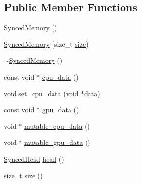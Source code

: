 \subsection*{Public Member Functions}
\begin{DoxyCompactItemize}
\item 
\hyperlink{classcaffe_1_1_synced_memory_a1554c965fa580eee8d425c9cc14ac264}{Synced\+Memory} ()
\item 
\hyperlink{classcaffe_1_1_synced_memory_a858ddd33252ddfd6e8bb2dc59ab7691b}{Synced\+Memory} (size\+\_\+t \hyperlink{classcaffe_1_1_synced_memory_ae181c18b137d62de33bc91501aabb841}{size})
\item 
\hyperlink{classcaffe_1_1_synced_memory_a0f9e02554b59ba5357ac1d0c9256560a}{$\sim$\+Synced\+Memory} ()
\item 
const void $\ast$ \hyperlink{classcaffe_1_1_synced_memory_a5ffa0255e243f223e1af064fb7322ae4}{cpu\+\_\+data} ()
\item 
void \hyperlink{classcaffe_1_1_synced_memory_a4118cdf888d8663c4f88c037ce3e3b8e}{set\+\_\+cpu\+\_\+data} (void $\ast$data)
\item 
const void $\ast$ \hyperlink{classcaffe_1_1_synced_memory_acf04d9fabcde73902bdad08672696933}{gpu\+\_\+data} ()
\item 
void $\ast$ \hyperlink{classcaffe_1_1_synced_memory_ab32cd46d7f0cf524d79e4ba7da7449dd}{mutable\+\_\+cpu\+\_\+data} ()
\item 
void $\ast$ \hyperlink{classcaffe_1_1_synced_memory_ab6ca4faa7233c8ac2319acb72ba0441e}{mutable\+\_\+gpu\+\_\+data} ()
\item 
\hyperlink{classcaffe_1_1_synced_memory_aa9d505f04322f6e521a57b8fc51dfba1}{Synced\+Head} \hyperlink{classcaffe_1_1_synced_memory_abd3e8f08d0186d3460fcce1378a2dc4c}{head} ()
\item 
size\+\_\+t \hyperlink{classcaffe_1_1_synced_memory_ae181c18b137d62de33bc91501aabb841}{size} ()
\end{DoxyCompactItemize}


